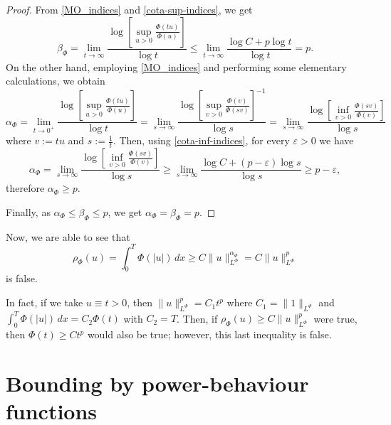 \documentclass[twoside]{article}
\theoremstyle{remark}
\newcommand{\orlnor}{\|_{L^{\Phi}}}
\renewcommand{\leq}{\leqslant}
\renewcommand{\geq}{\geqslant}
\begin{document}
\begin{proof}
From \eqref{MO_indices} and \eqref{cota-sup-indices}, we get 
\[
\beta_{\Phi}=\lim\limits_{t \to \infty} \frac{\log\left[\sup\limits_{u>0} \frac{\Phi(tu)}{\Phi(u)}\right]}{\log t}
\leq
\lim \limits_{t \to \infty} \frac{\log C+p\log t}{\log t}=p.
\]
On the other hand, employing \eqref{MO_indices} and performing some elementary calculations, we obtain
\[
\alpha_{\Phi}=
\lim\limits_{t \to 0^+} \frac{\log\left[\sup\limits_{u>0} \frac{\Phi(tu)}{\Phi(u)}\right]}{\log t}=
\lim\limits_{s \to \infty} \frac{\log\left[\sup\limits_{v>0} \frac{\Phi(v)}{\Phi(sv)}\right]^{-1}}{\log s}=
\lim\limits_{s \to \infty} \frac{\log\left[\inf\limits_{v>0} \frac{\Phi(sv)}{\Phi(v)}\right]}{\log s}
\]
where $v:=tu$ and $s:=\frac{1}{t}$.
Then, using \eqref{cota-inf-indices},  for every $\varepsilon>0$ we have
\[
\alpha_{\Phi}=
\lim\limits_{s \to \infty} \frac{\log\left[\inf\limits_{v>0} \frac{\Phi(sv)}{\Phi(v)}\right]}{\log s}\geq
\lim\limits_{s \to \infty} \frac{\log C+(p-\varepsilon)\log s}{\log s}\geq p-\varepsilon,
\]
therefore $\alpha_{\Phi}\geq p$. 

Finally, as $\alpha_{\Phi}\leq \beta_{\Phi}\leq p$, we get  
$\alpha_{\Phi}=\beta_{\Phi}=p$.
\end{proof}



Now, we are able to see that 
\[
\rho_{\Phi}(u)=\int_0^T \Phi(|u|)\,dx\geq C\|u\orlnor^{\alpha_{\Phi}}=C\|u\orlnor^p
\]
is false.

In fact, if we take $u\equiv t>0$, then $\|u\orlnor^p=C_1t^p$ where $C_1=\|1\orlnor$ and
$\int_0^T \Phi(|u|)\,dx=C_2\Phi(t)$ with $C_2=T$. 
Then, if $\rho_{\Phi}(u)\geq C\|u\orlnor^p$ were true, then $\Phi(t)\geq C t^p$ would also be true; however, this
last inequality is false.
 


\section{Bounding by power-behaviour functions}
\end{document}
